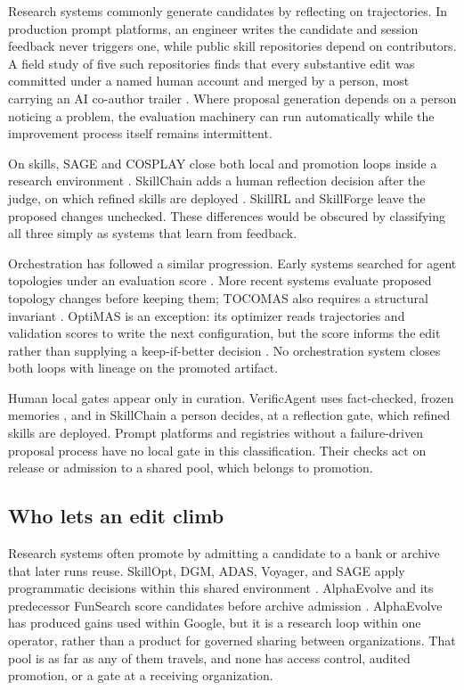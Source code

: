 Research systems commonly generate candidates by reflecting on trajectories. In production prompt platforms, an engineer writes the candidate and session feedback never triggers one, while public skill repositories depend on contributors. A field study of five such repositories finds that every substantive edit was committed under a named human account and merged by a person, most carrying an AI co-author trailer \citep{shen2026whomaintains}. Where proposal generation depends on a person noticing a problem, the evaluation machinery can run automatically while the improvement process itself remains intermittent.

On skills, SAGE and COSPLAY close both local and promotion loops inside a research environment \citep{wang2025sage, wu2026cosplay}. SkillChain adds a human reflection decision after the judge, on which refined skills are deployed \citep{hu2026skillchain}. SkillRL and SkillForge leave the proposed changes unchecked. These differences would be obscured by classifying all three simply as systems that learn from feedback.

Orchestration has followed a similar progression. Early systems searched for agent topologies under an evaluation score \citep{zhuge2024gptswarm, zhang2024aflow}. More recent systems evaluate proposed topology changes before keeping them; TOCOMAS also requires a structural invariant \citep{chu2026agentgrad, chen2026harnessforge, zhao2026tocomas}. OptiMAS is an exception: its optimizer reads trajectories and validation scores to write the next configuration, but the score informs the edit rather than supplying a keep-if-better decision \citep{cheng2026optimas}. No orchestration system closes both loops with lineage on the promoted artifact.

Human local gates appear only in curation. VerificAgent uses fact-checked, frozen memories \citep{nguyen2025verificagent}, and in SkillChain a person decides, at a reflection gate, which refined skills are deployed. Prompt platforms and registries without a failure-driven proposal process have no local gate in this classification. Their checks act on release or admission to a shared pool, which belongs to promotion.

\subsection{Who lets an edit climb}\label{who-lets-an-edit-climb}

Research systems often promote by admitting a candidate to a bank or archive that later runs reuse. SkillOpt, DGM, ADAS, Voyager, and SAGE apply programmatic decisions within this shared environment \citep{yang2026skillopt, zhang2025darwin, hu2024adas, wang2023voyager, wang2025sage}. AlphaEvolve and its predecessor FunSearch score candidates before archive admission \citep{alphaevolve2025, romeraparedes2024funsearch}. AlphaEvolve has produced gains used within Google, but it is a research loop within one operator, rather than a product for governed sharing between organizations. That pool is as far as any of them travels, and none has access control, audited promotion, or a gate at a receiving organization.

